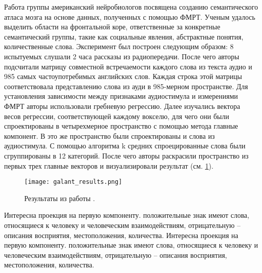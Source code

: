 \documentclass[pdftex,ptm,12pt,a4paper]{report}
\theoremstyle{definition}
\begin{document}
Работа \cite{huth2016natural} группы американский нейробиологов посвящена созданию семантического атласа мозга на основе данных, полученных с помощью ФМРТ. Ученым удалось выделить области на фронтальной коре, ответственные за конкретные семантический группы, такие как социальные явления, абстрактные понятия, количественные слова. Эксперимент был построен следующим образом: 8 испытуемых слушали 2 часа рассказы из радиопередачи. После чего авторы подсчитали матрицу совместной встречаемости каждого слова из текста аудио и 985 самых частоупотребимых английских слов. Каждая строка этой матрицы соответствовала представлению слова из ауди в 985-мерном пространстве. Для установления зависимости между признаками аудиостимула и измерениями ФМРТ авторы использовали гребневую регрессию. Далее изучались вектора весов регрессии, соответствующей каждому вокселю, для чего они были спроектированы в четырехмерное пространство с помощью метода главные компонент. В это же пространство были спроектированы и слова из аудиостимула. С помощью алгоритма k средних спроецированные слова были сгруппированы в 12 категорий. После чего авторы раскрасили пространство из первых трех главные векторов и визуализировали результат (см. \ref{huth_result}). 

\begin{figure}[h]
\texttt{[image: galant\_results.png]}
\centering
\caption{Результаты из работы \cite{huth2016natural}.}
\label{huth_result}
\end{figure}

Интересна проекция на первую компоненту. положительные знак имеют слова, относящиеся к человеку и человеческим взаимодействиям, отрицательную -- описания восприятия, местоположения, количества.
Интересна проекция на первую компоненту. положительные знак имеют слова, относящиеся к человеку и человеческим взаимодействиям, отрицательную -- описания восприятия, местоположения, количества.



\end{document}
